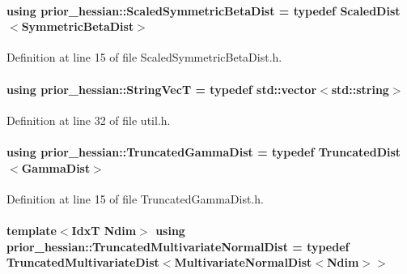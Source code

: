 \paragraph[{\texorpdfstring{Scaled\+Symmetric\+Beta\+Dist}{ScaledSymmetricBetaDist}}]{\setlength{\rightskip}{0pt plus 5cm}using {\bf prior\+\_\+hessian\+::\+Scaled\+Symmetric\+Beta\+Dist} = typedef {\bf Scaled\+Dist}$<${\bf Symmetric\+Beta\+Dist}$>$}\hypertarget{namespaceprior__hessian_ae84776b8f8ed86c14a5ce47a29b7a1be}{}\label{namespaceprior__hessian_ae84776b8f8ed86c14a5ce47a29b7a1be}


Definition at line 15 of file Scaled\+Symmetric\+Beta\+Dist.\+h.

\paragraph[{\texorpdfstring{String\+VecT}{StringVecT}}]{\setlength{\rightskip}{0pt plus 5cm}using {\bf prior\+\_\+hessian\+::\+String\+VecT} = typedef std\+::vector$<$std\+::string$>$}\hypertarget{namespaceprior__hessian_a61fc0176249462ee94fe3cca92cf3f8c}{}\label{namespaceprior__hessian_a61fc0176249462ee94fe3cca92cf3f8c}


Definition at line 32 of file util.\+h.

\paragraph[{\texorpdfstring{Truncated\+Gamma\+Dist}{TruncatedGammaDist}}]{\setlength{\rightskip}{0pt plus 5cm}using {\bf prior\+\_\+hessian\+::\+Truncated\+Gamma\+Dist} = typedef {\bf Truncated\+Dist}$<${\bf Gamma\+Dist}$>$}\hypertarget{namespaceprior__hessian_acd158ecf6698fbe5a4430df7730d3aba}{}\label{namespaceprior__hessian_acd158ecf6698fbe5a4430df7730d3aba}


Definition at line 15 of file Truncated\+Gamma\+Dist.\+h.

\paragraph[{\texorpdfstring{Truncated\+Multivariate\+Normal\+Dist}{TruncatedMultivariateNormalDist}}]{\setlength{\rightskip}{0pt plus 5cm}template$<$IdxT Ndim$>$ using {\bf prior\+\_\+hessian\+::\+Truncated\+Multivariate\+Normal\+Dist} = typedef {\bf Truncated\+Multivariate\+Dist}$<${\bf Multivariate\+Normal\+Dist}$<$Ndim$>$$>$}\hypertarget{namespaceprior__hessian_a99ef03c8a3e476931d451d6d944ffae5}{}\label{namespaceprior__hessian_a99ef03c8a3e476931d451d6d944ffae5}


